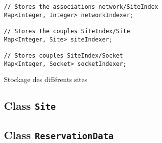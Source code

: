\documentclass[a4paper,11pt]{article}
\let\Oldsubsection\subsection
\renewcommand{\subsection}{\FloatBarrier\Oldsubsection}
\begin{document}
\begin{listing}[htp]
    \begin{verbatim}
// Stores the associations network/SiteIndex
Map<Integer, Integer> networkIndexer;

// Stores the couples SiteIndex/Site
Map<Integer, Site> siteIndexer;

// Stores couples SiteIndex/Socket
Map<Integer, Socket> socketIndexer;
      \end{verbatim}
    \caption{Stockage des différents sites}
    \label{lst:stockagesite}
\end{listing}



\subsection{Class \texttt{Site}}

\subsection{Class \texttt{ReservationData}}
\end{document}
